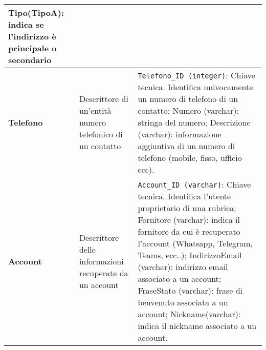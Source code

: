 \begin{longtable}{p{}p{}p{}}
Tipo(TipoA): indica se l’indirizzo è principale o secondario
\\ \midrule
\textbf{Telefono} &
Descrittore di un'entità numero telefonico di un contatto &
\verb|Telefono_ID (integer)|: Chiave tecnica. Identifica univocamente un numero di telefono di un contatto; \newline
Numero (varchar): stringa del numero;\newline
Descrizione (varchar): informazione aggiuntiva di un numero di telefono (mobile, fisso, ufficio ecc).
\\ \midrule
\textbf{Account} &
Descrittore delle informazioni recuperate da un account &
\verb|Account_ID (varchar)|: Chiave tecnica. Identifica l’utente proprietario di una rubrica;\newline
Fornitore (varchar): indica il fornitore da cui è recuperato l'account (Whatsapp, Telegram, Teams, ecc..);\newline
IndirizzoEmail (varchar): indirizzo email associato a un account;\newline
FraseStato (varchar): frase di benvenuto associata a un account;\newline
Nickname(varchar): indica il nickname associato a un account.
\\ \bottomrule
\end{longtable}
\clearpage
